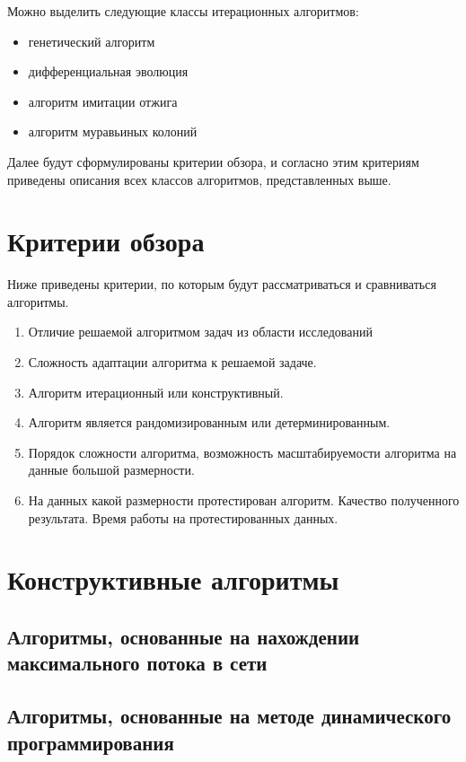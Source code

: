 \documentclass{article}
\begin{document}
  Можно выделить следующие классы итерационных алгоритмов:
  \begin{itemize}
    \item генетический алгоритм
    \item дифференциальная эволюция
    \item алгоритм имитации отжига
    \item алгоритм муравьиных колоний
  \end{itemize}
  Далее будут сформулированы критерии обзора, и согласно этим критериям приведены описания всех классов алгоритмов, представленных выше.
  \newpage

  \section{Критерии обзора}

  Ниже приведены критерии, по которым будут рассматриваться и сравниваться алгоритмы.
  \begin{enumerate}
    \item Отличие решаемой алгоритмом задач из области исследований
    \item Сложность адаптации алгоритма к решаемой задаче.
    \item Алгоритм итерационный или конструктивный.
    \item Алгоритм является рандомизированным или детерминированным.
    \item Порядок сложности алгоритма, возможность масштабируемости алгоритма на данные большой размерности.
    \item На данных какой размерности протестирован алгоритм. Качество полученного результата. Время работы на протестированных данных.
  \end{enumerate}

  \section{Конструктивные алгоритмы}
  \subsection{Алгоритмы, основанные на нахождении максимального потока в сети}

  \subsection{Алгоритмы, основанные на методе динамического программирования}

  \printbibliography
\end{document}
